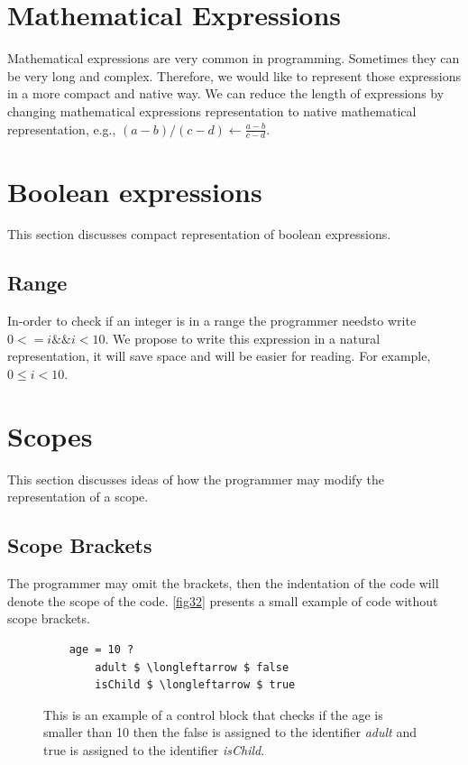 \section{Mathematical Expressions}
Mathematical expressions are very common in programming. Sometimes they can be very long and complex. Therefore, we would like to represent those expressions in a more compact and native way. We can reduce the length of expressions by changing mathematical expressions representation to native mathematical representation, e.g., $ (a-b)/(c-d) \longleftarrow \frac{a-b}{c-d} $.
\section{Boolean expressions}
This section discusses compact representation of boolean expressions.
\subsection{Range} \label{subsection: Range}
In-order to check if an integer is in a range the programmer needsto write $ 0 <= i \&\& i < 10 $. We propose to write this expression in a natural representation, it will save space and will be easier for reading. For example, $ 0 \leq i < 10 $.
\section{Scopes}
This section discusses ideas of how the programmer may modify the representation of a scope.
\subsection{Scope Brackets}
The programmer may omit the brackets, then the indentation of the code will denote the scope of the code. \autoref{fig32} presents a small example of code without scope brackets.
\begin{figure}[H]
	\begin{lstlisting}
	age = 10 ?
		adult $ \longleftarrow $ false
		isChild $ \longleftarrow $ true
	\end{lstlisting}
	\caption{This is an example of a control block that checks if the age is smaller than 10 then the false is assigned to the identifier \textit{adult} and true is assigned to the identifier \textit{isChild}.}
	\label{fig32}
\end{figure}
